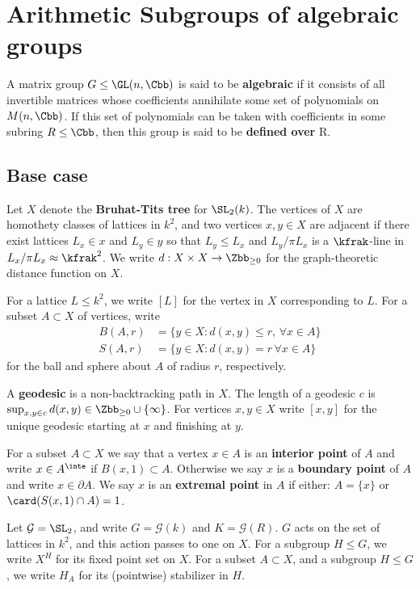 \documentclass{amsart}
\begin{document}
\section{Arithmetic Subgroups of algebraic groups}
A matrix group $G \leq \GL(n,\Cbb)$ is said to be \textbf{algebraic} if it consists of all invertible matrices whose coefficients annihilate some set of polynomials on $M(n,\Cbb)$. If this set of polynomials can be taken with coefficients in some subring $R \leq \Cbb$, then this group is said to be \textbf{defined over} R.




\subsection{Base case}
Let $X$ denote the \textbf{Bruhat-Tits tree} for $\SL_2(k)$. The vertices of $X$ are homothety classes of lattices in $k^2$, and two vertices $x,y \in X$ are adjacent if there exist lattices $L_x \in x$ and $L_y \in y$ so that $L_y \leq L_x$ and $L_y/ \pi L_x$ is a $\kfrak$-line in $L_x / \pi L_x \approx \kfrak^2$. We write $d: X \times X \to \Zbb_{\geq 0}$ for the graph-theoretic distance function on $X$.

For a lattice $L \leq k^2$, we write $[L]$ for the vertex in $X$ corresponding to $L$. For a subset $A \subset X$ of vertices, write
\begin{align*}
	B(A,r) & = \{ y \in X: d(x,y)\leq  r,\, \forall x \in A\} \\
	S(A,r) & = \{ y \in X: d(x,y) = r \, \forall x \in A\}
\end{align*}
for the ball and sphere about $A$ of radius $r$, respectively.

A \textbf{geodesic} is a non-backtracking path in $X$.  The length of a geodesic $c$ is $\sup_{x,y \in c} d(x,y) \in \Zbb_{\geq 0} \cup \{\infty\}$. For vertices $x,y
	\in X$ write $[x,y]$ for the unique geodesic starting at $x$ and finishing at $y$.

For a subset $A \subset X$ we say that a vertex $x\in A$ is an {\bf interior point} of $A$ and write $x\in A^\inte$ if $B(x,1) \subset A$. Otherwise we say $x$ is a {\bf boundary point} of $A$ and write $x\in \partial A$. We say $x$ is an \textbf{extremal point} in $A$ if either: $A=\{x\}$ or $\card(S(x,1) \cap A) = 1$.

Let $\mathcal{G}= \SL_{2}$, and write  $G=\mathcal{G}(k)$  and $K= \mathcal{G}(R)$. $G$ acts on the set of lattices in $k^2$, and this action passes to one on $X$.  For a subgroup $H \leq G$, we write $X^H$ for its fixed point set on $X$. For a subset $A \subset X$,  and a subgroup $H\leq G$, we write $H_A$ for its (pointwise) stabilizer in $H$.
\end{document}
